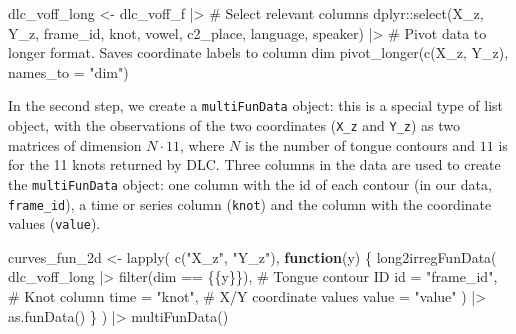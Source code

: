 \documentclass[
  man,
  longtable,
  nolmodern,
  notxfonts,
  notimes,
  colorlinks=true,linkcolor=blue,citecolor=blue,urlcolor=blue]{apa7}
\newenvironment{Shaded}{\begin{snugshade}}{\end{snugshade}}
\newcommand{\AttributeTok}[1]{\textcolor[rgb]{0.40,0.45,0.13}{#1}}
\newcommand{\CommentTok}[1]{\textcolor[rgb]{0.37,0.37,0.37}{#1}}
\newcommand{\ControlFlowTok}[1]{\textcolor[rgb]{0.00,0.23,0.31}{\textbf{#1}}}
\newcommand{\FunctionTok}[1]{\textcolor[rgb]{0.28,0.35,0.67}{#1}}
\newcommand{\NormalTok}[1]{\textcolor[rgb]{0.00,0.23,0.31}{#1}}
\newcommand{\OtherTok}[1]{\textcolor[rgb]{0.00,0.23,0.31}{#1}}
\newcommand{\SpecialCharTok}[1]{\textcolor[rgb]{0.37,0.37,0.37}{#1}}
\newcommand{\StringTok}[1]{\textcolor[rgb]{0.13,0.47,0.30}{#1}}
\begin{document}
\begin{Shaded}
\begin{Highlighting}[]
\NormalTok{dlc\_voff\_long }\OtherTok{\textless{}{-}}\NormalTok{ dlc\_voff\_f }\SpecialCharTok{|\textgreater{}} 
  \CommentTok{\# Select relevant columns}
\NormalTok{  dplyr}\SpecialCharTok{::}\FunctionTok{select}\NormalTok{(X\_z, Y\_z, frame\_id, knot, vowel, c2\_place, language, speaker) }\SpecialCharTok{|\textgreater{}} 
  \CommentTok{\# Pivot data to longer format. Saves coordinate labels to column \textasciigrave{}dim\textasciigrave{}}
  \FunctionTok{pivot\_longer}\NormalTok{(}\FunctionTok{c}\NormalTok{(X\_z, Y\_z), }\AttributeTok{names\_to =} \StringTok{"dim"}\NormalTok{)}
\end{Highlighting}
\end{Shaded}

In the second step, we create a \texttt{multiFunData} object: this is a
special type of list object, with the observations of the two
coordinates (\texttt{X\_z} and \texttt{Y\_z}) as two matrices of
dimension \(N \cdot 11\), where \(N\) is the number of tongue contours
and \(11\) is for the 11 knots returned by DLC. Three columns in the
data are used to create the \texttt{multiFunData} object: one column
with the id of each contour (in our data, \texttt{frame\_id}), a time or
series column (\texttt{knot}) and the column with the coordinate values
(\texttt{value}).

\begin{Shaded}
\begin{Highlighting}[]
\NormalTok{curves\_fun\_2d }\OtherTok{\textless{}{-}} \FunctionTok{lapply}\NormalTok{(}
  \FunctionTok{c}\NormalTok{(}\StringTok{"X\_z"}\NormalTok{, }\StringTok{"Y\_z"}\NormalTok{),}
  \ControlFlowTok{function}\NormalTok{(y) \{}
    \FunctionTok{long2irregFunData}\NormalTok{(}
\NormalTok{      dlc\_voff\_long }\SpecialCharTok{|\textgreater{}} \FunctionTok{filter}\NormalTok{(dim }\SpecialCharTok{==}\NormalTok{ \{\{y\}\}),}
      \CommentTok{\# Tongue contour ID}
      \AttributeTok{id =} \StringTok{"frame\_id"}\NormalTok{,}
      \CommentTok{\# Knot column}
      \AttributeTok{time =} \StringTok{"knot"}\NormalTok{,}
      \CommentTok{\# X/Y coordinate values}
      \AttributeTok{value =} \StringTok{"value"}
\NormalTok{    ) }\SpecialCharTok{|\textgreater{}} 
    \FunctionTok{as.funData}\NormalTok{()}
\NormalTok{  \}}
\NormalTok{) }\SpecialCharTok{|\textgreater{}} 
  \FunctionTok{multiFunData}\NormalTok{()}
\end{Highlighting}
\end{Shaded}
\end{document}
